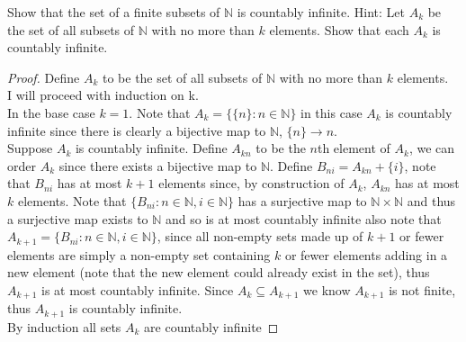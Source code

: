 \documentclass[12pt]{article}
\makeatletter
\theoremstyle{homework}
\newenvironment{exercise}[1]
{\def\@currentlabel{#1}\exercisecore}
{\endexercisecore}
\newcommand{\Nats}{\ensuremath{\mathbb N}}
\makeatother
\begin{document}
\begin{exercise}{Supplemental 3}
Show that the set of a finite subsets of $\Nats$ is countably infinite.
Hint: Let $A_k$ be the set of all subsets of $\Nats$ with
no more than $k$ elements.  Show that each $A_k$ is countably infinite.
\end{exercise}
\begin{proof}
Define $A_k$ to be the set of all subsets of $\Nats$ with
no more than $k$ elements.\\
I will proceed with induction on k.\\
In the base case $k=1$.  Note that $A_k=\{\{n\}:n\in \Nats\}$ in this case $A_k$ is countably infinite since there is clearly a bijective map to $\Nats$, $\{n\}\rightarrow n$.\\
Suppose $A_k$ is countably infinite.  Define $A_{kn}$ to be the $n$th element of $A_k$, we can order $A_k$ since there exists a bijective map to $\Nats$.  Define $B_{ni}=A_{kn}+\{i\}$, note that $B_{ni}$ has at most $k+1$ elements since, by construction of $A_k$, $A_{kn}$ has at most $k$ elements.  Note that $\{B_{ni}:n\in\Nats, i\in\Nats\}$ has a surjective map to $\Nats\times \Nats$ and thus a surjective map exists to $\Nats$ and so is at most countably infinite also note that $A_{k+1}=\{B_{ni}:n\in\Nats, i\in\Nats\}$, since all non-empty sets made up of $k+1$ or fewer elements are simply a non-empty set containing $k$ or fewer elements adding in a new element (note that the new element could already exist in the set), thus $A_{k+1}$ is at most countably infinite.  Since $A_k\subseteq A_{k+1}$ we know $A_{k+1}$ is not finite, thus $A_{k+1}$ is countably infinite.\\
By induction all sets $A_k$ are countably infinite
\end{proof}
\end{document}
